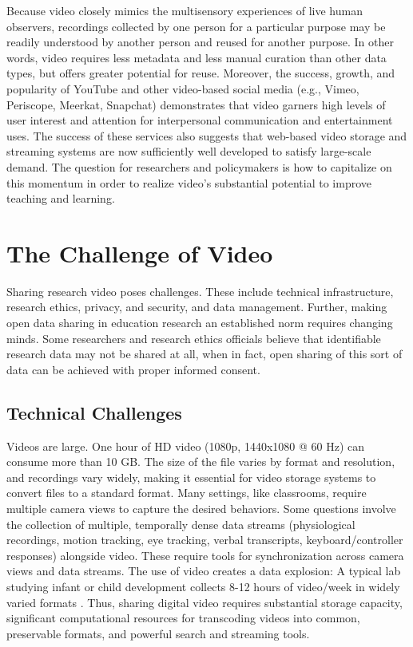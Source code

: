 \documentclass[letterpaper,man,apacite]{apa6}
\begin{document}
Because video closely mimics the multisensory experiences of live human observers, recordings collected by one person for a particular purpose may be readily understood by another person and reused for another purpose.
In other words, video requires less metadata and less manual curation than other data types, but offers greater potential for reuse.
Moreover, the success, growth, and popularity of YouTube and other video-based social media (e.g., Vimeo, Periscope, Meerkat, Snapchat) demonstrates that video garners high levels of user interest and attention for interpersonal communication and entertainment uses.
The success of these services also suggests that web-based video storage and streaming systems are now sufficiently well developed to satisfy large-scale demand.
The question for researchers and policymakers is how to capitalize on this momentum in order to realize video's substantial potential to improve teaching and learning. 

\section{The Challenge of Video}

Sharing research video poses challenges.
These include technical infrastructure, research ethics, privacy, and security, and data management. 
Further, making open data sharing in education research an established norm requires changing minds. 
Some researchers and research ethics officials believe that identifiable research data may not be shared at all, when in fact, open sharing of this sort of data can be achieved with proper informed consent.

\subsection{Technical Challenges}

Videos are large.
One hour of HD video (1080p, 1440x1080 @ 60 Hz) can consume more than 10 GB.
The size of the file varies by format and resolution, and recordings vary widely, making it essential for video storage systems to convert files to a standard format.
Many settings, like classrooms, require multiple camera views to capture the desired behaviors.
Some questions involve the collection of multiple, temporally dense data streams (physiological recordings, motion tracking, eye tracking, verbal transcripts, keyboard/controller responses) alongside video.
These require tools for synchronization across camera views and data streams.
The use of video creates a data explosion: A typical lab studying infant or child development collects 8-12 hours of video/week in widely varied formats \cite{Survey2012}. 
Thus, sharing digital video requires substantial storage capacity, significant computational resources for transcoding videos into common, preservable formats, and powerful search and streaming tools. 
\end{document}
